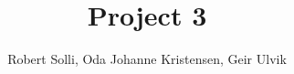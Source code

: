 \documentclass[12pt]{article}
\begin{document}
\title{Project 3}
\author{Robert Solli, Oda Johanne Kristensen, Geir Ulvik}
\maketitle








\end{document}
